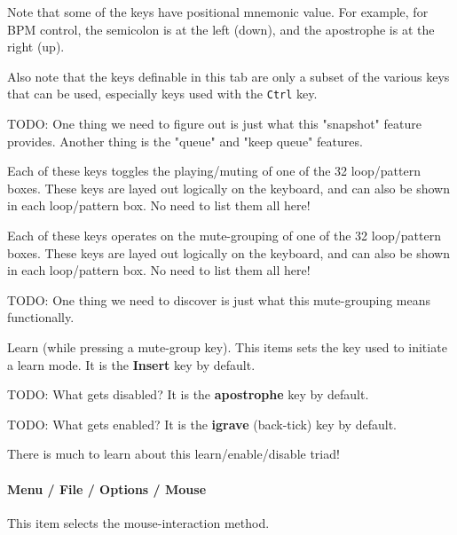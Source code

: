    Note that some of the keys have positional mnemonic value.  For example,
   for BPM control, the semicolon is at the left (down), and the apostrophe
   is at the right (up).

   Also note that the keys definable in this tab are only a subset of the
   various keys that can be used, especially keys used with the
   \texttt{Ctrl} key.

   TODO:  
   One thing we need to figure out is just what this "snapshot"
   feature provides.
   Another thing is the "queue" and "keep queue" features.

   Each of these keys toggles the playing/muting of one of the 32
   loop/pattern boxes.  These keys are layed out logically on the keyboard,
   and can also be shown in each loop/pattern box.  No need to list them all
   here!

   Each of these keys operates on the mute-grouping of one of the 32
   loop/pattern boxes.  These keys are layed out logically on the keyboard,
   and can also be shown in each loop/pattern box.  No need to list them all
   here!

   TODO: 
   One thing we need to discover is just what this mute-grouping
   means functionally.

   Learn (while pressing a mute-group key).
   This items sets the key used to initiate a learn mode.
   It is the \textbf{Insert} key by default.

   TODO:  What gets disabled?
   It is the \textbf{apostrophe} key by default.

   TODO: What gets enabled?
   It is the \textbf{igrave} (back-tick) key by default.

   There is much to learn about this learn/enable/disable triad!

\paragraph{Menu / File / Options / Mouse }
\label{paragraph:seq24_menu_file_options_mouse}

   This item selects the mouse-interaction method.

